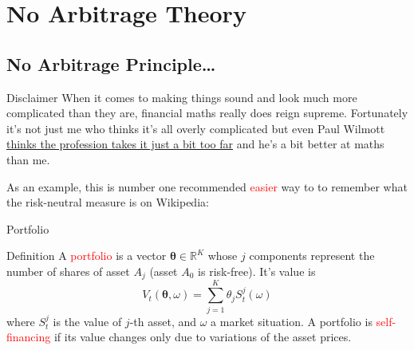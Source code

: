 \documentclass{beamer}
\begin{document}
\section{No Arbitrage Theory}
\subsection{No Arbitrage Principle\ldots}

\begin{frame}{Disclaimer}
  When it comes to making things sound and look much more complicated than they are, financial maths really does reign supreme. Fortunately it’s not just me who thinks it’s all overly complicated but even Paul Wilmott \href{https://wilmott.com/science-in-finance-viii-the-maths-sweet-spot/}{thinks the profession takes it just a bit too far} and he’s a bit better at maths than me.\vspace{0.5cm}
  
\pause
As an example, this is number one recommended \textcolor{red}{easier} way to to remember what the risk-neutral measure is on Wikipedia:

\end{frame}

\begin{frame}{Portfolio}
	\begin{block}{Definition}
		A \textcolor{red}{portfolio} is a vector $\mathbf{\theta}\in \mathbb{R}^K$ whose $j$ components represent the number of shares of asset $A_j$ (asset $A_0$ is risk-free). It's value is
		\begin{equation}
			V_t(\mathbf{\theta}, \omega)=\sum_{j=1}^K\theta_jS^j_t(\omega)
		\end{equation} 
		where $S_t^j$ is the value of $j$-th asset, and $\omega$ a market situation. A portfolio is \textcolor{red}{self-financing} if its value changes only due to variations of the asset prices.
	\end{block}
\end{frame}
\end{document}
